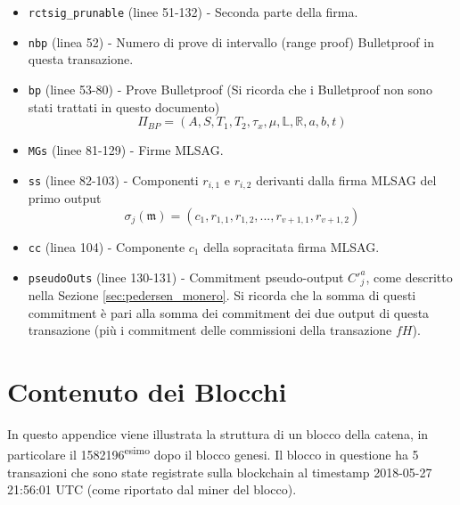 \begin{appendices}
\begin{itemize}
    \item {\tt rctsig\_prunable} (linee 51-132) - Seconda parte della firma.
    \item {\tt nbp} (linea 52) - Numero di prove di intervallo (range proof) Bulletproof in questa transazione.
    \item {\tt bp} (linee 53-80) - Prove Bulletproof (Si ricorda che i Bulletproof non sono stati trattati in questo documento)\vspace{.175cm}
    \[\Pi_{BP} = (A, S, T_1, T_2, \tau_x, \mu, \mathbb{L}, \mathbb{R}, a, b, t)\]
    \item {\tt MGs} (linee 81-129) - Firme MLSAG.
    \item {\tt ss} (linee 82-103) - Componenti \(r_{i,1}\) e \(r_{i,2}\) derivanti dalla firma MLSAG del primo output\vspace{.175cm}
    \[\sigma_j(\mathfrak{m}) = (c_1, r_{1, 1}, r_{1, 2}, ..., r_{v+1, 1}, r_{v+1, 2})\]
    \item {\tt cc} (linea 104) - Componente \(c_1\) della sopracitata firma MLSAG.
    \item {\tt pseudoOuts} (linee 130-131) - Commitment pseudo-output $C'^a_j$, come descritto nella Sezione  \ref{sec:pedersen_monero}. Si ricorda che la somma di questi commitment è pari alla somma dei commitment dei due output di questa transazione (più i commitment delle commissioni della transazione $f H$).
\end{itemize}




\chapter{Contenuto dei Blocchi}
\label{appendix:block-content}

In questo appendice viene illustrata la struttura di un blocco della catena, in particolare il 1582196\textsuperscript{esimo} dopo il blocco genesi. Il blocco in questione ha 5 transazioni che sono state registrate sulla blockchain al timestamp 2018-05-27 21:56:01 UTC (come riportato dal miner del blocco).


\end{appendices}
